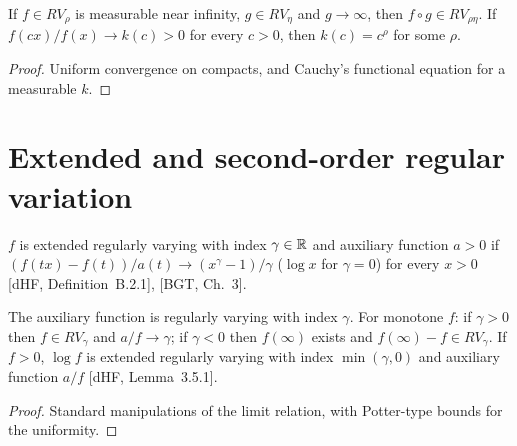 \begin{theorem}
  \label{thm:rv-composition}
  \leanok
  If $f \in RV_\rho$ is measurable near infinity, $g \in RV_\eta$ and $g \to \infty$, then
  $f \circ g \in RV_{\rho \eta}$. If $f(cx)/f(x) \to k(c) > 0$ for every $c > 0$, then $k(c) = c^\rho$ for some
  $\rho$.
\end{theorem}
\begin{proof}
  \leanok
  Uniform convergence on compacts, and Cauchy's functional equation for a measurable $k$.
\end{proof}

\section{Extended and second-order regular variation}

\begin{definition}
  \label{def:extended-rv}
  \leanok
  $f$ is extended regularly varying with index $\gamma \in \mathbb{R}$ and auxiliary function $a > 0$ if
  $(f(tx) - f(t))/a(t) \to (x^\gamma - 1)/\gamma$ ($\log x$ for $\gamma = 0$) for every $x > 0$
  [dHF, Definition~B.2.1], [BGT, Ch.~3].
\end{definition}

\begin{theorem}
  \label{thm:extended-rv}
  \leanok
  The auxiliary function is regularly varying with index $\gamma$. For monotone $f$: if $\gamma > 0$
  then $f \in RV_\gamma$ and $a/f \to \gamma$; if $\gamma < 0$ then $f(\infty)$ exists and
  $f(\infty) - f \in RV_\gamma$. If $f > 0$, $\log f$ is extended regularly varying with index
  $\min(\gamma, 0)$ and auxiliary function $a/f$ [dHF, Lemma~3.5.1].
\end{theorem}
\begin{proof}
  \leanok
  Standard manipulations of the limit relation, with Potter-type bounds for the uniformity.
\end{proof}


